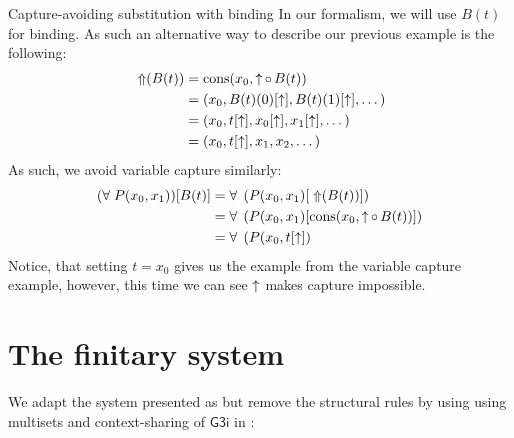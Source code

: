 \begin{cthexample}{Capture-avoiding substitution with binding}
  In our formalism, we will use \(B(t)\) for binding. As such an alternative way to describe our previous example is the following:
    {\small\begin{align*}
    \operatorname{\;\Uparrow}(B(t)) &= \operatorname{cons}(x_0,\operatorname{\uparrow} \operatorname{\circ} B(t)) \\
                &= (x_0, B(t)(0)[\operatorname{\uparrow}], B(t)(1)[\operatorname{\uparrow}], \dots) \\
                &= (x_0, t[\operatorname{\uparrow}], x_0[\operatorname{\uparrow}], x_1[\operatorname{\uparrow}], \dots)  \\
                &= (x_0, t[\operatorname{\uparrow}], x_1, x_2, \dots)
    \end{align*}}
    As such, we avoid variable capture similarly:
    {\small\begin{align*}
      (\forall\; P(x_0, x_1)) [ B(t) ]
      &= \forall\; \left( P(x_0, x_1) [ \operatorname{\;\Uparrow}(B(t)) ] \right) \\
      &= \forall\; \left( P(x_0, x_1) [ \operatorname{cons}(x_0,\operatorname{\uparrow} \operatorname{\circ} B(t)) ] \right) \\
      &= \forall\; \left( P(x_0, t[\operatorname{\uparrow}] \right)
    \end{align*}}
    Notice, that setting \(t = x_0\) gives us the example from the variable capture example, however, this time we can see \(\operatorname{\uparrow}\) makes capture impossible.
\end{cthexample}

\break

\section{The finitary system}
We adapt the system presented as \cite{SID15} but remove the structural rules by using using multisets and context-sharing of $\textsf{G3i}$ in \cite{TRO00}:


